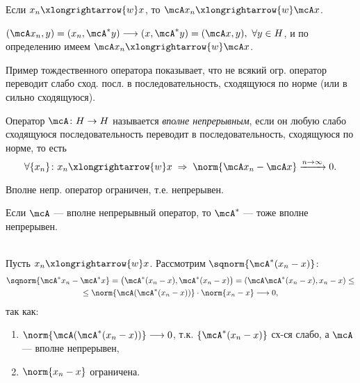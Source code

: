 \begin{lemma}
Если $x_n\xlongrightarrow{w}x$, то $\mcA x_n \xlongrightarrow{w} \mcA x$.
\end{lemma}
\begin{proofocre}
$(\mcA x_n, y) = (x_n, \mcA^* y)\longrightarrow(x, \mcA^* y)=(\mcA x, y),~\forall y\in H$, и по определению имеем $\mcA x_n\xlongrightarrow{w}\mcA x$.
\end{proofocre}

\begin{example}
Пример тождественного оператора показывает, что не всякий огр. оператор переводит слабо сход. посл. в последовательность, сходящуюся по норме (или в сильно сходящуюся).
\end{example}

\begin{definition}
Оператор $\mcA\colon H\to H$ называется \emph{вполне непрерывным}, если он любую слабо
сходящуюся последовательность переводит в последовательность, сходящуюся по норме, то есть 
$$\forall\{x_n\}\colon x_n\xlongrightarrow{w}x \;\Rightarrow\; \norm{\mcA x_n - \mcA x}\xrightarrow{n\to\infty}0.$$
\end{definition}

\begin{Commentwhite}
Вполне непр. оператор ограничен, т.е. непрерывен.
\end{Commentwhite}

\begin{theorem}
Если $\mcA$ --- вполне непрерывный оператор, то $\mcA^*$ --- тоже вполне непрерывен.
\end{theorem}
\begin{proofocre}
~\\
Пусть $x_n\xlongrightarrow{w}x$. Рассмотрим $\sqnorm{\mcA^*(x_n - x)}$:
\begin{multline*}
    \sqnorm{\mcA^* x_n - \mcA^* x} = \big(\mcA^* (x_n - x), \mcA^* (x_n - x)\big) = (\mcA\mcA^*(x_n - x), x_n - x)\le\\
    \le\norm{\mcA(\mcA^*(x_n - x))}\cdot\norm{x_n - x}\longrightarrow0,
\end{multline*}
так как:
\begin{enumerate}
    \item $\norm{\mcA(\mcA^*(x_n - x))}\longrightarrow0$, т.к. $\{ \mcA^*(x_n - x) \}$ сх-ся слабо, а $\mcA$ --- вполне непрерывен,
    \item $\norm{x_n - x}$ ограничена.
\end{enumerate}
\end{proofocre}



